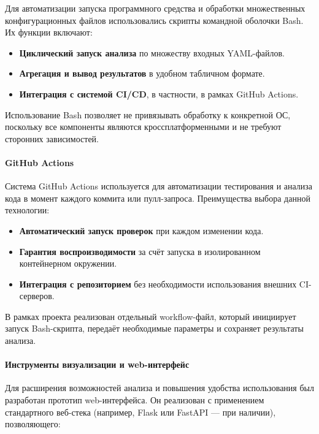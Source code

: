 Для автоматизации запуска программного средства и обработки множественных конфигурационных файлов использовались скрипты командной оболочки Bash. Их функции включают:

\begin{itemize}
  \item \textbf{Циклический запуск анализа} по множеству входных YAML-файлов.
  \item \textbf{Агрегация и вывод результатов} в удобном табличном формате.
  \item \textbf{Интеграция с системой CI/CD}, в частности, в рамках GitHub Actions.
\end{itemize}

Использование Bash позволяет не привязывать обработку к конкретной ОС, поскольку все компоненты являются кроссплатформенными и не требуют сторонних зависимостей.

\paragraph{GitHub Actions}

Система GitHub Actions используется для автоматизации тестирования и анализа кода в момент каждого коммита или пулл-запроса. Преимущества выбора данной технологии:

\begin{itemize}
  \item \textbf{Автоматический запуск проверок} при каждом изменении кода.
  \item \textbf{Гарантия воспроизводимости} за счёт запуска в изолированном контейнерном окружении.
  \item \textbf{Интеграция с репозиторием} без необходимости использования внешних CI-серверов.
\end{itemize}

В рамках проекта реализован отдельный workflow-файл, который инициирует запуск Bash-скрипта, передаёт необходимые параметры и сохраняет результаты анализа.

\paragraph{Инструменты визуализации и web-интерфейс}

Для расширения возможностей анализа и повышения удобства использования был разработан прототип web-интерфейса. Он реализован с применением стандартного веб-стека (например, Flask или FastAPI — при наличии), позволяющего:

